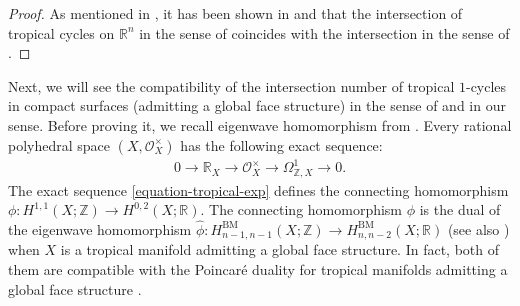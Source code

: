 \documentclass[a4paper,dvipdfmx,reqno,12pt]{amsart}
\theoremstyle{definition}
\numberwithin{equation}{section}
\begin{document}
\begin{proof}
As mentioned in \cite[]{MR3032930},
it has been shown in \cite{MR3529085} and \cite{MR2887109}
that the intersection of tropical cycles on
$\mathbb{R}^n$ in the sense of \cite{MR2591823}
coincides with the intersection in the sense of
\cite{MR2149011,MR2275625}.
\end{proof}

Next, we will see the compatibility of
the intersection number of tropical $1$-cycles
in compact surfaces (admitting a global face structure)
in the sense of \cite{shaw2015tropical,demedrano2023chern}
and in our sense. Before proving it,
we recall eigenwave homomorphism from
\cite{MR3961331,MR3894860}.
Every rational polyhedral space $(X,\mathcal{O}_X^{\times})$
has the following exact sequence:
\begin{align}
\label{equation-tropical-exp}
0\to \mathbb{R}_X \to 
\mathcal{O}_X^{\times} \to \Omega_{\mathbb{Z},X}^{1}\to 0.
\end{align}
The exact sequence \eqref{equation-tropical-exp}
defines
the connecting homomorphism
$\phi \colon H^{1,1}(X;\mathbb{Z})
\to H^{0,2}(X;\mathbb{R})$.
The connecting homomorphism
$\phi$ is the dual of the
eigenwave homomorphism
$\hat{\phi} \colon
H_{n-1,n-1}^{\mathrm{BM}}(X;\mathbb{Z})
\to H_{n,n-2}^{\mathrm{BM}}(X;\mathbb{R})$
\cite[(5.2)]{MR3330789}
(see also \cite[Definition 2.9]{MR3894860})
when $X$ is a tropical manifold admitting
a global face structure.
In fact, both of them are compatible with 
the Poincar\'e duality for tropical manifolds
admitting a global face structure
\cite[Lemma 5.13]{MR3894860}.
\end{document}

